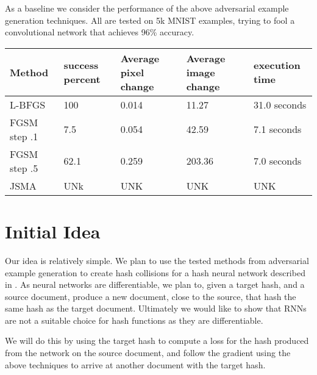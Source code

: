 \documentclass{article}
\begin{document}
As a baseline we consider the performance of the above adversarial example
generation techniques.  All are tested on 5k MNIST examples, trying to fool
a convolutional network that achieves 96\% accuracy.

\begin{tabular}{l | l l l l}
    Method & success percent & Average pixel change & Average image change & execution time\\ \hline
    L-BFGS & 100 & 0.014 & 11.27 & 31.0 seconds \\
    FGSM step .1 & 7.5 & 0.054 & 42.59 & 7.1 seconds \\
    FGSM step .5 & 62.1 & 0.259 & 203.36 & 7.0 seconds \\
    JSMA & UNk & UNK & UNK & UNK
\end{tabular}

\section{Initial Idea}

Our idea is relatively simple. We plan to use the tested methods from adversarial example generation to
create hash collisions for a hash neural network described in \cite{hash1}. As neural networks are 
differentiable, we plan to, given a target hash, and a source document, produce a new document, close 
to the source, that hash the same hash as the target document. 
Ultimately we would like to show that RNNs are not a suitable choice for hash functions as they are
differentiable. 

We will do this by using the target hash to compute a loss for the hash produced from the network on the
source document, and follow the gradient using the above techniques to arrive at another document with the
target hash.


 
\end{document}
